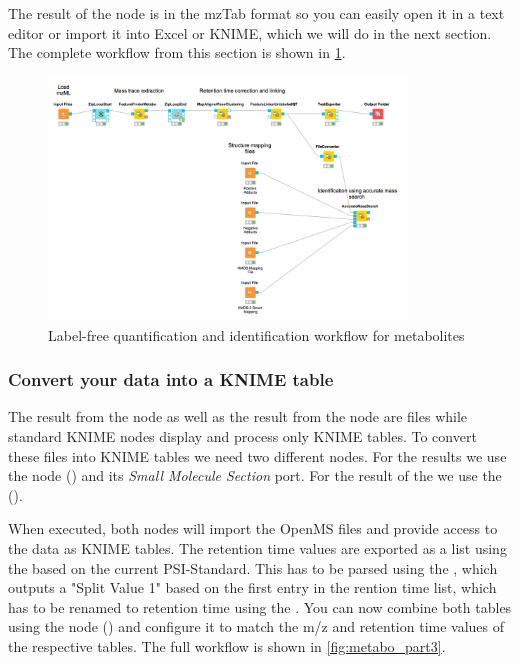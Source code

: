 The result of the  node is in the mzTab format \cite{Griss2014} so you can easily open it in a text editor or import it into Excel or KNIME, which we will do in the next section.
The complete workflow from this section is shown in \cref{fig:metabo_part2}.

\begin{figure}[htbp]
  \centering
  \includegraphics[width=0.85\textwidth]{graphics/metabo/metabo_part2.png}
  \caption{Label-free quantification and identification workflow for metabolites}
  \label{fig:metabo_part2}
\end{figure}

\subsubsection{Convert your data into a KNIME table}

The result from the  node as well as the result from the  node are files while standard KNIME nodes display and process only KNIME tables. To convert these files into KNIME tables we need two different nodes.
For the  results we use the  node () and its \textit{Small Molecule Section} port. For the result of the  we use the  ().

When executed, both nodes will import the OpenMS files and provide access to the data as KNIME tables. The retention time values are exported as a list using the  based on the current PSI-Standard. This has to be parsed using the , which outputs a "Split Value 1" based on the first entry in the rention time list, which has to be renamed to retention time using the . You can now combine both tables using the  node () and configure it to match the m/z and retention time values of the respective tables. The full workflow is shown in \cref{fig:metabo_part3}.


